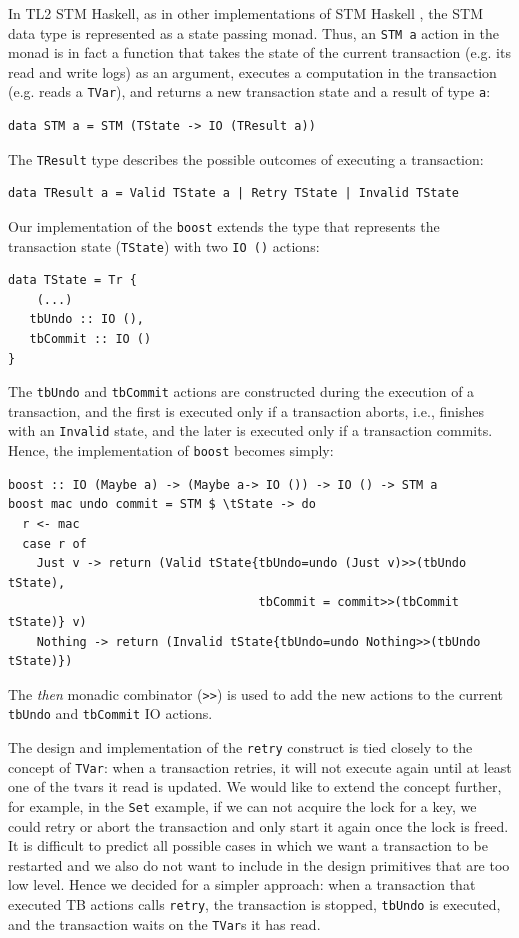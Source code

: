 \documentclass{llncs}
\begin{document}
In TL2 STM Haskell, as in other implementations of STM Haskell \cite{stmch,twilight}, the STM data type is represented
as a state passing monad. Thus, an {\tt STM a} action in the monad is in fact a 
function that takes
 the state of the current transaction (e.g. its read and write logs) as an argument, executes a computation
in the transaction (e.g. reads a {\tt TVar}), and returns a new transaction state and a result of type {\tt a}:

{\small\begin{verbatim}
data STM a = STM (TState -> IO (TResult a))
\end{verbatim}}

The {\tt TResult} type describes the possible outcomes of executing a transaction:

{\small\begin{verbatim}
data TResult a = Valid TState a | Retry TState | Invalid TState
\end{verbatim}}

Our implementation of the {\tt boost} extends the type that represents the transaction state ({\tt TState}) with
two {\tt IO ()} actions:

{\small\begin{verbatim}
data TState = Tr {
	(...)
   tbUndo :: IO (),
   tbCommit :: IO ()
}
\end{verbatim}}

The {\tt tbUndo} and {\tt tbCommit} actions are constructed during the execution of a transaction, and the first is
executed only if a transaction aborts, i.e., finishes with an {\tt Invalid} state, and the later is executed only
if a transaction commits. Hence, the implementation of {\tt boost} becomes simply:

{\small\begin{verbatim}
boost :: IO (Maybe a) -> (Maybe a-> IO ()) -> IO () -> STM a
boost mac undo commit = STM $ \tState -> do
  r <- mac
  case r of
    Just v -> return (Valid tState{tbUndo=undo (Just v)>>(tbUndo tState), 
                                   tbCommit = commit>>(tbCommit tState)} v)
    Nothing -> return (Invalid tState{tbUndo=undo Nothing>>(tbUndo tState)})
\end{verbatim}}

The {\it then} monadic combinator ({\tt >>}) is used to add the new actions to the current {\tt tbUndo}
and {\tt tbCommit} IO actions.

The design and implementation of the {\tt retry} construct is tied closely to the concept of 
{\tt TVar}: when a transaction retries, it will not execute again until at least one of the
tvars it read is updated. We would like to extend the concept further, for example, in the
{\tt Set} example, if we can not acquire the lock for a key, we could retry or abort the transaction
and only start it again once the lock is freed. It is difficult to predict all possible cases in which
we want a transaction to be restarted and we also do not want to include in the design primitives
that are too low level. Hence we decided for a simpler approach: when a transaction that executed
TB actions calls {\tt retry}, the transaction is stopped, {\tt tbUndo} is executed, and the transaction 
waits on the {\tt TVar}s it
has read. 
\end{document}
